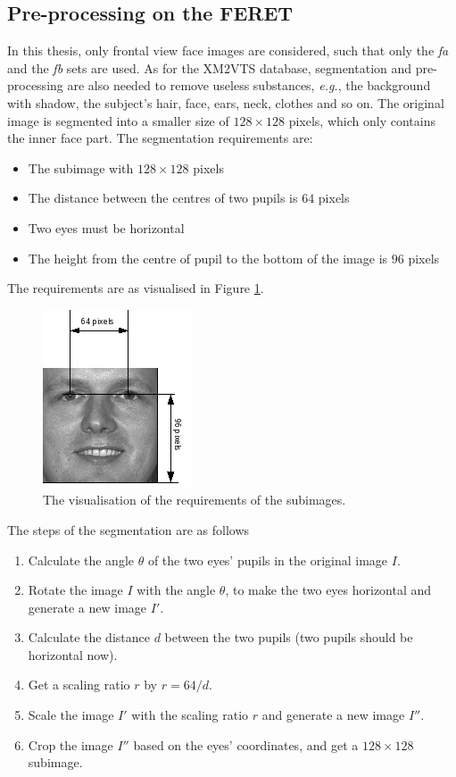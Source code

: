 \subsection{Pre-processing on the FERET}
In this thesis, only frontal view face images are considered, such that only the \textit{fa} and the \textit{fb} sets are used. As for the \mbox{XM2VTS} database, segmentation and pre-processing are also needed to remove useless substances, \textit{e.g.}, the background with shadow, the subject's hair, face, ears, neck, clothes and so on. The original image is segmented into a smaller size of $128\times 128$ pixels, which only contains the inner face part. The segmentation requirements are:
\begin{itemize}
 \item The subimage with $128\times 128$ pixels
 \item The distance between the centres of two pupils is $64$ pixels
 \item Two eyes must be horizontal
 \item The height from the centre of pupil to the bottom of the image is $96$ pixels
\end{itemize}
The requirements are as visualised in \mbox{Figure} \ref{fig:requirements}.
\begin{figure}[ht]
 \begin{center}
  \includegraphics[]{ch5/figures/InnerFaceFERET.png}
  \caption{The visualisation of the requirements of the subimages.}
  \label{fig:requirements}
 \end{center}
\end{figure} 
The steps of the segmentation are as follows
\begin{enumerate}
 \item Calculate the angle $\theta$ of the two eyes' pupils in the original image $I$.
 \item Rotate the image $I$ with the angle $\theta$, to make the two eyes horizontal and generate a new image $I'$.
 \item Calculate the distance $d$ between the two pupils (two pupils should be horizontal now).
 \item Get a scaling ratio $r$ by $r = 64/d$.
 \item Scale the image $I'$ with the scaling ratio $r$ and generate a new image $I''$.
 \item Crop the image $I''$ based on the eyes' coordinates, and get a $128\times 128$ subimage.
\end{enumerate}
